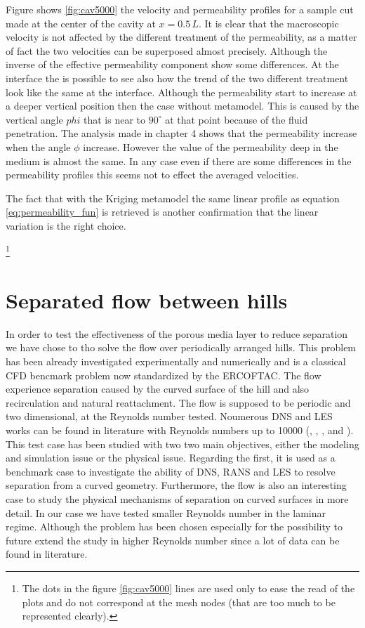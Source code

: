 Figure shows \ref{fig:cav5000} the velocity and permeability profiles for a sample cut made at the center of the cavity at $x=0.5\,L$.
It is clear that the macroscopic velocity is not affected by the different treatment of the permeability, as a matter of fact the two velocities can be superposed almost precisely.
Although the inverse of the effective permeability component show some differences. At the interface the is possible to see also how the trend of the two different treatment look like the same at the interface. Although the permeability start to increase at a deeper vertical position then the case without metamodel. This is caused by the vertical angle $phi$ that is near to $90^\circ$ at that point because of the fluid penetration. The analysis made in chapter 4 shows that the permeability increase when the angle $\phi$ increase.
However the value of the permeability deep in the medium is almost the same. 
In any case even if there are some differences in the permeability profiles this seems not to effect the averaged velocities.

The fact that with the Kriging metamodel the same linear profile as equation \ref{eq:permeability_fun} is retrieved is another confirmation that the linear variation is the right choice.


\footnote{The dots in the figure \ref{fig:cav5000} lines are used only to ease the read of the plots and do not correspond at the mesh nodes (that are too much to be represented clearly).}

\section{Separated flow between hills}
In order to test the effectiveness of the porous media layer to reduce separation we have chose to tho solve the flow over periodically arranged hills. This problem  has been already investigated experimentally and numerically and is a classical CFD bencmark problem now standardized by the ERCOFTAC. 
The flow experience separation caused by the curved surface of the hill and also recirculation and natural reattachment. The flow is supposed to be periodic and two dimensional, at the Reynolds number tested. Noumerous DNS and LES works can be found in literature with Reynolds numbers up to 10000 (\citet{chang2014simulations}, \citet{breuer2005issues}, \citet{breuer2009flow}, \cite{almeida1993wake} and \cite{temmerman2001large}).
This test case has been studied with two two main objectives, either the modeling and simulation issue or the physical issue. Regarding the first, it is used as a benchmark case to investigate the ability of DNS, RANS and LES to resolve separation from a curved geometry. Furthermore, the flow is also an interesting case to study the physical mechanisms of separation on curved surfaces in more detail.
In our case we have tested smaller Reynolds number in the laminar regime. Although the problem has been chosen especially for the possibility to future extend the study in higher Reynolds number since a lot of data can be found in literature.

